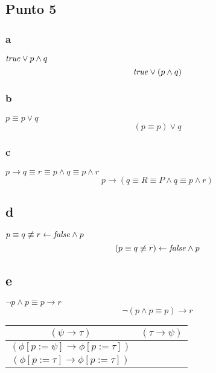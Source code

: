 \documentclass{article}
\begin{document}
\subsection{Punto 5}
\subsubsection{a}
\begin{logicenv}{$\textrm{\textit{true}} \lor p \land q$}
    \[\textrm{\textit{true}} \lor (p \land q)\]
\end{logicenv}

\subsubsection{b}
\begin{logicenv}{$p \equiv p \lor q$}
    \[(p \equiv p) \lor q\]
\end{logicenv}

\subsubsection{c}
\begin{logicenv}{$p \to q \equiv r \equiv p \land q \equiv p \land r$}
    \[p \to (q \equiv R \equiv P \land q \equiv p \land r)\]
\end{logicenv}

\subsection{d}
\begin{logicenv}{$p \equiv q \not\equiv r \gets \textrm{\textit{false}} \land p$}
    \[(p \equiv q \not\equiv r) \gets \textrm{\textit{false}} \land p\]
\end{logicenv}

\subsection{e}
\begin{logicenv}{$\neg p \land p \equiv p \to r$}
    \[\neg(p \land p \equiv p) \to r\]
\end{logicenv}

\begin{center}
    \begin{tabular}{c c}
        $(\psi \to \tau)$ & $(\tau \to \psi)$\\
        \hline
        $(\phi[p:= \psi] \to \phi[p:= \tau])$\\
        $(\phi[p:= \tau] \to \phi[p:= \tau])$
    \end{tabular}
\end{center}
\end{document}
